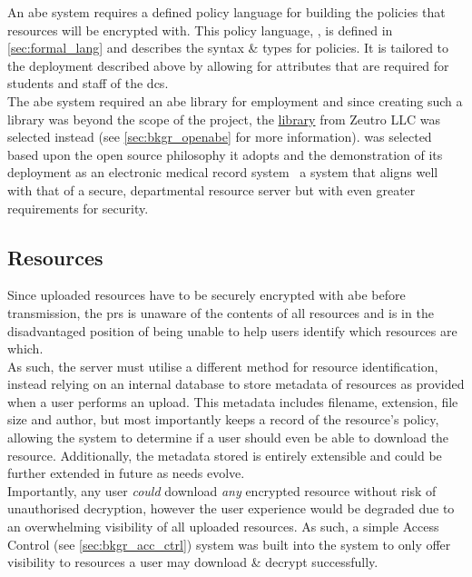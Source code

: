 An \acrfull{abe} system requires a defined policy language for building the policies that resources will be encrypted with. This policy language, \thePolicyLang, is defined in \cref{sec:formal_lang} and describes the syntax \& types for policies. It is tailored to the deployment described above by allowing for attributes that are required for students and staff of the \acrshort{dcs}.\\
The \acrshort{abe} system required an \acrshort{abe} library for employment and since creating such a library was beyond the scope of the project, the \href{https://github.com/zeutro/openabe}{\OpenABE library} from Zeutro LLC was selected instead (see \cref{sec:bkgr_openabe} for more information). \OpenABE was selected based upon the open source philosophy it adopts and the demonstration of its deployment as an electronic medical record system \citet{Akinyele2011} \textemdash\ a system that aligns well with that of a secure, departmental resource server but with even greater requirements for security.

\subsection{Resources}
\label{subsec:design_resources}

Since uploaded resources have to be securely encrypted with \acrshort{abe} before transmission, the \acrfull{prs} is unaware of the contents of all resources and is in the disadvantaged position of being unable to help users identify which resources are which.\\
As such, the server must utilise a different method for resource identification, instead relying on an internal database to store metadata of resources as provided when a user performs an upload. This metadata includes filename, extension, file size and author, but most importantly keeps a record of the resource's policy, allowing the system to determine if a user should even be able to download the resource. Additionally, the metadata stored is entirely extensible and could be further extended in future as needs evolve.\\
Importantly, any user \textit{could} download \textit{any} encrypted resource without risk of unauthorised decryption, however the user experience would be degraded due to an overwhelming visibility of all uploaded resources. As such, a simple Access Control (see \cref{sec:bkgr_acc_ctrl}) system was built into the system to only offer visibility to resources a user may download \& decrypt successfully.
